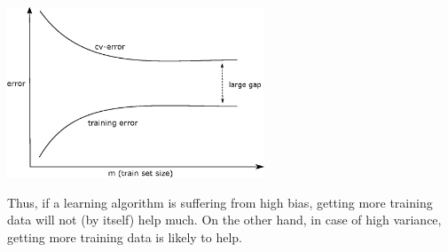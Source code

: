 \documentclass[a4paper,11pt]{report}
\begin{document}
\begin{center}
\includegraphics[height = 2in]{Images/learn_curve_variance}
\end{center}

Thus, if a learning algorithm is suffering from high bias, getting more training data will not (by itself) help much. On the other hand, in case of high variance, getting more training data is likely to help.
\end{document}
